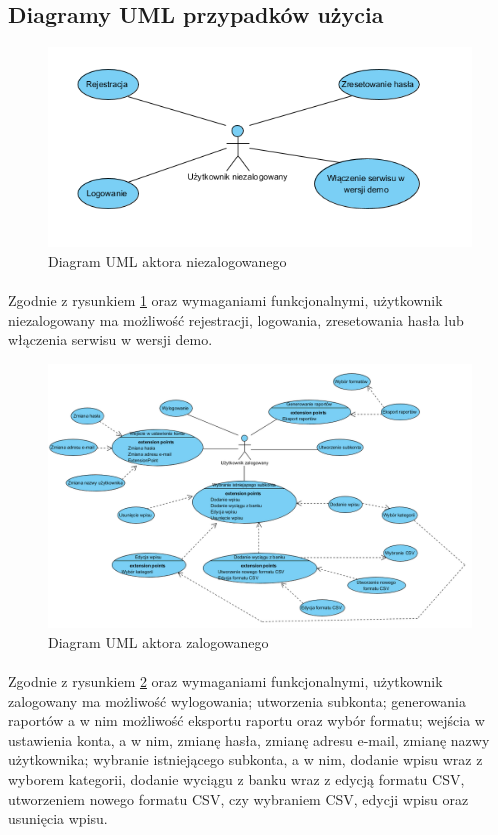 \documentclass{article}
\begin{document}
	\subsection{Diagramy UML przypadków użycia}
	\begin{figure}[h]
		\centering
		\includegraphics[scale=0.9]{assets/uml1.png}
		\caption[]{Diagram UML aktora niezalogowanego}
		\label{fig:niezalakt}
	\end{figure} 
	\paragraph*{} Zgodnie z rysunkiem \ref{fig:niezalakt} oraz wymaganiami funkcjonalnymi, użytkownik niezalogowany ma możliwość rejestracji, logowania, zresetowania hasła lub włączenia serwisu w wersji demo.
	\begin{figure}[H]
		\hspace*{-4cm} 
		\includegraphics[scale=0.75]{assets/uml2.png}
		\caption[]{Diagram UML aktora zalogowanego}
		\label{fig:zalakt}
	\end{figure} 
	\paragraph*{} Zgodnie z rysunkiem \ref{fig:zalakt} oraz wymaganiami funkcjonalnymi, użytkownik zalogowany ma możliwość wylogowania; utworzenia subkonta; generowania raportów a w nim możliwość eksportu raportu oraz wybór formatu; wejścia w ustawienia konta, a w nim, zmianę hasła, zmianę adresu e-mail, zmianę nazwy użytkownika; wybranie istniejącego subkonta, a w nim, dodanie wpisu wraz z wyborem kategorii, dodanie wyciągu z banku wraz z edycją formatu CSV, utworzeniem nowego formatu CSV, czy wybraniem CSV, edycji wpisu oraz usunięcia wpisu.
\end{document}
